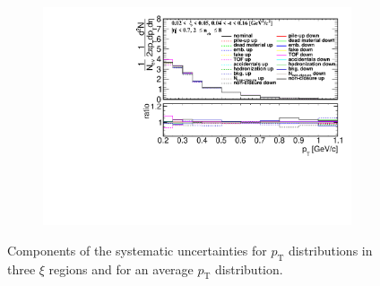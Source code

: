 \begin{figure}[h!]
\begin{subfigure}{.49\textwidth}
	\end{subfigure}
	\begin{subfigure}{.49\textwidth}
		\includegraphics[width=\textwidth,page=19]{chapters/chrgSTAR/img/syst/out_chargedmax.pdf}
	\end{subfigure}
	\caption{Components of the systematic uncertainties for $p_\textrm{T}$ distributions in three $\xi$ regions and for an average $p_\textrm{T}$ distribution. }
	\label{fig:results_star_pt_syst}
	\vspace{-2.5cm}
\end{figure}	

